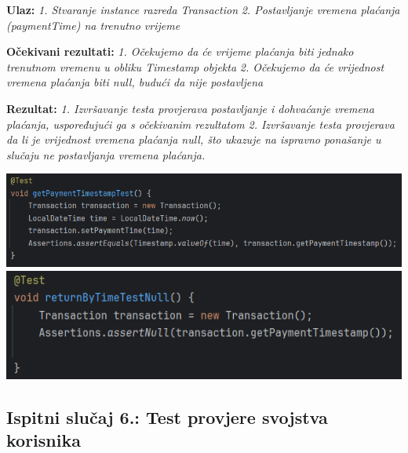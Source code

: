                                                                        \textbf{Ulaz:}
                                                                        \textit{1. Stvaranje instance razreda Transaction}
                                                                        \textit{2. Postavljanje vremena plaćanja (paymentTime) na trenutno vrijeme}

                                                                        \textbf{Očekivani rezultati:}
                                                                        \textit{1. Očekujemo da će vrijeme plaćanja biti jednako trenutnom vremenu u obliku Timestamp objekta}
                                                                        \textit{2. Očekujemo da će vrijednost vremena plaćanja biti null, budući da nije postavljena}


                                                                        \textbf{Rezultat:}
                                                                        \textit{1. Izvršavanje testa provjerava postavljanje i dohvaćanje vremena plaćanja, uspoređujući ga s očekivanim rezultatom}
                                                                        \textit{2. Izvršavanje testa provjerava da li je vrijednost vremena plaćanja null, što ukazuje na ispravno ponašanje u slučaju ne postavljanja vremena plaćanja.}


            \includegraphics[width=1\linewidth]{slike/TransactionTest.png}
            \includegraphics[width=1\linewidth]{slike/TransactionTest1.png}


            \subsection{Ispitni slučaj 6.: Test provjere svojstva korisnika}

